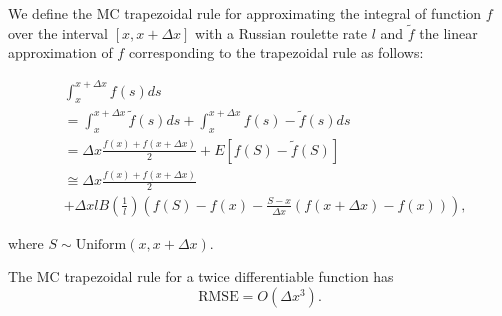\documentclass[a4paper,12pt]{article}
\begin{document}
\begin{definition}
    We define the MC trapezoidal rule for approximating the integral
    of function $f$ over the interval $[x, x+\Delta x]$ with a Russian roulette rate
    $l$ and $\tilde{f}$ the linear approximation of $f$ corresponding
    to the trapezoidal rule as follows:

    \begin{align}
         & \int_{x}^{x+\Delta x} f(s) ds                           \\
         & = \int_{x}^{x+\Delta x}  \tilde{f}(s) ds +
        \int_{x}^{x+\Delta x}  f(s) - \tilde{f}(s) ds              \\
         & = \Delta x \frac{f(x) + f(x+\Delta x)}{2}
        + E \left[f(S) - \tilde{f}(S)\right]                       \\
         & \cong \Delta x \frac{f(x) + f(x+\Delta x)}{2} \nonumber \\
         & + \Delta x l B\left( \frac{1}{l}\right)
        \left(f(S) - f(x) - \frac{S - x}{\Delta x}
        \left(f(x+\Delta x) - f(x)\right) \right), \label{eq:MCtrap}
    \end{align}

    where $S \sim \text{Uniform}(x,x+\Delta x)$.
\end{definition}

\begin{lemma} \label{lem:rmse mctrap}
    The MC trapezoidal rule
    for a twice differentiable function has
    \begin{equation}
        \text{RMSE} =O\left( \Delta x^{3} \right) .
    \end{equation}
\end{lemma}
\end{document}
